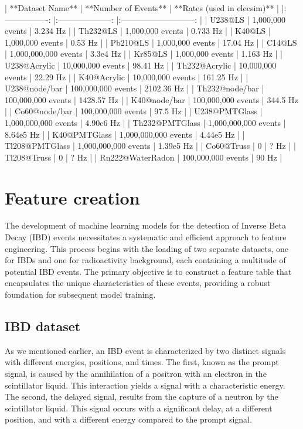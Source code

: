 | **Dataset Name**  | **Number of Events**  | **Rates (used in elecsim)**  |
|:----------------: |:--------------------: |:---------------------------: |
|      U238@LS      |   1,000,000 events    |           3.234 Hz           |
|     Th232@LS      |   1,000,000 events    |           0.733 Hz           |
|      K40@LS       |   1,000,000 events    |           0.53 Hz            |
|     Pb210@LS      |   1,000,000 events    |           17.04 Hz           |
|      C14@LS       | 1,000,000,000 events  |           3.3e4 Hz           |
|      Kr85@LS      |   1,000,000 events    |           1.163 Hz           |
|   U238@Acrylic    |   10,000,000 events   |           98.41 Hz           |
|   Th232@Acrylic   |   10,000,000 events   |           22.29 Hz           |
|    K40@Acrylic    |   10,000,000 events   |          161.25 Hz           |
|   U238@node/bar   |  100,000,000 events   |          2102.36 Hz          |
|  Th232@node/bar   |  100,000,000 events   |          1428.57 Hz          |
|   K40@node/bar    |  100,000,000 events   |           344.5 Hz           |
|   Co60@node/bar   |  100,000,000 events   |           97.5 Hz            |
|   U238@PMTGlass   | 1,000,000,000 events  |          4.90e6 Hz           |
|  Th232@PMTGlass   | 1,000,000,000 events  |          8.64e5 Hz           |
|   K40@PMTGlass    | 1,000,000,000 events  |          4.44e5 Hz           |
|  Tl208@PMTGlass   | 1,000,000,000 events  |          1.39e5 Hz           |
|    Co60@Truss     |           0           |             ? Hz             |
|    Tl208@Truss    |           0           |             ? Hz             |
| Rn222@WaterRadon  |  100,000,000 events   |            90 Hz             |


\section{Feature creation}
The development of machine learning models for the detection of Inverse Beta Decay (IBD) events necessitates a systematic and efficient approach to feature engineering. This process begins with the loading of two separate datasets, one for IBDs and one for radioactivity background, each containing a multitude of potential IBD events. The primary objective is to construct a feature table that encapsulates the unique characteristics of these events, providing a robust foundation for subsequent model training.

\subsection{IBD dataset}
As we mentioned earlier, an IBD event is characterized by two distinct signals with different energies, positions, and times. The first, known as the prompt signal, is caused by the annihilation of a positron with an electron in the scintillator liquid. This interaction yields a signal with a characteristic energy. The second, the delayed signal, results from the capture of a neutron by the scintillator liquid. This signal occurs with a significant delay, at a different position, and with a different energy compared to the prompt signal.

